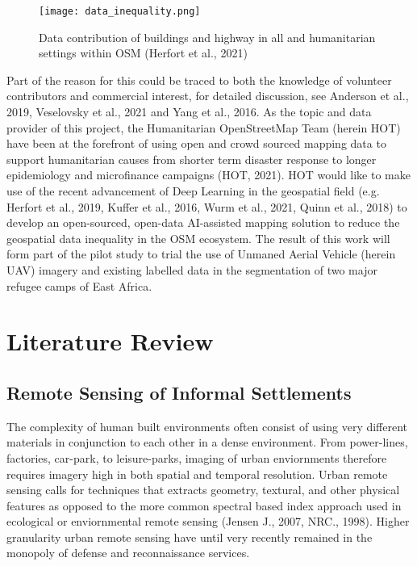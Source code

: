 \documentclass[11pt, a4paper, twoside]{report}
\begin{document}
\begin{figure}[H]
  \centering
  \texttt{[image: data\_inequality.png]}
  \caption{Data contribution of buildings and highway in all and humanitarian settings within OSM (Herfort et al., 2021)}
  \label{fig:data_inequality}
\end{figure}

Part of the reason for this could be traced to both the knowledge of volunteer contributors and commercial interest, for detailed discussion, see Anderson et al., 2019, Veselovsky et al., 2021 and Yang et al., 2016. As the topic and data provider of this project, the Humanitarian OpenStreetMap Team (herein HOT) have been at the forefront of using open and crowd sourced mapping data to support humanitarian causes from shorter term disaster response to longer epidemiology and microfinance campaigns (HOT, 2021). HOT would like to make use of the recent advancement of Deep Learning in the geospatial field (e.g. Herfort et al., 2019, Kuffer et al., 2016, Wurm et al., 2021, Quinn et al., 2018) to develop an open-sourced, open-data AI-assisted mapping solution to reduce the geospatial data inequality in the OSM ecosystem. The result of this work will form part of the pilot study to trial the use of Unmaned Aerial Vehicle (herein UAV) imagery and existing labelled data in the segmentation of two major refugee camps of East Africa.\\\par

\newpage

\chapter{Literature Review}\label{LitReview}

\section{Remote Sensing of Informal Settlements}\label{RSofInformalSettlement}

The complexity of human built environments often consist of using very different materials in conjunction to each other in a dense environment. From power-lines, factories, car-park, to leisure-parks, imaging of urban enviornments therefore requires imagery high in both spatial and temporal resolution. Urban remote sensing calls for techniques that extracts geometry, textural, and other physical features as opposed to the more common spectral based index approach used in ecological or enviornmental remote sensing (Jensen J., 2007, NRC., 1998). Higher granularity urban remote sensing have until very recently remained in the monopoly of defense and reconnaissance services.\\\par
\end{document}
